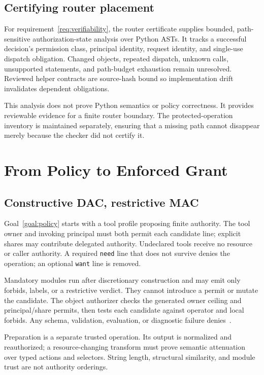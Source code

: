 \documentclass[letterpaper,twocolumn,10pt]{article}
\newcommand{\code}[1]{\texttt{#1}}
\begin{document}
\subsection{Certifying router placement}

For requirement~\ref{req:verifiability}, the router certificate supplies bounded,
path-sensitive authorization-state
analysis over Python ASTs. It tracks a successful decision's permission class,
principal identity, request identity, and single-use dispatch obligation.
Changed objects, repeated dispatch, unknown calls, unsupported statements, and
path-budget exhaustion remain unresolved. Reviewed helper contracts are
source-hash bound so implementation drift invalidates dependent obligations.

This analysis does not prove Python semantics or policy correctness. It provides
reviewable evidence for a finite router boundary. The protected-operation
inventory is maintained separately, ensuring that a missing path cannot
disappear merely because the checker did not certify it.

\section{From Policy to Enforced Grant}
\label{sec:grant}

\subsection{Constructive DAC, restrictive MAC}

Goal~\ref{goal:policy} starts with a tool profile proposing finite authority.
The tool owner and invoking principal
must both permit each candidate line; explicit shares may contribute delegated
authority. Undeclared tools receive no resource or caller authority. A required
\code{need} line that does not survive denies the operation; an optional
\code{want} line is removed.

Mandatory modules run after discretionary construction and may emit only
forbids, labels, or a restrictive verdict. They cannot introduce a permit or
mutate the candidate. The object authorizer checks the generated owner ceiling and principal/share
permits, then tests each candidate against operator and local forbids. Any schema,
validation, evaluation, or diagnostic failure denies~\cite{cedar}.

Preparation is a separate trusted operation. Its output is normalized and
reauthorized; a resource-changing transform must prove semantic attenuation over
typed actions and selectors. String length, structural similarity, and module
trust are not authority orderings.
\end{document}
